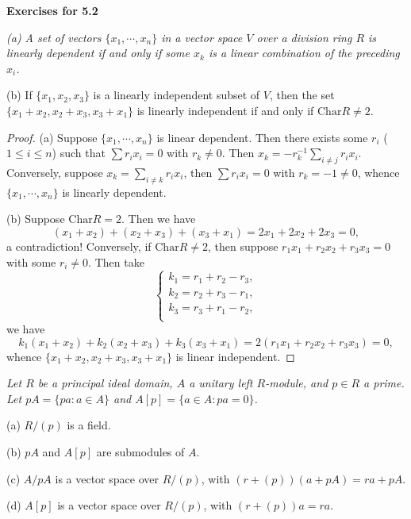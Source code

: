 \begin{center}
\begin{large}
    \textbf{Exercises for 5.2}
\end{large}
\end{center}
\begin{problem}\em
(a) A set of vectors $\{x_1,\cdots,x_n\}$ in a vector space $V$ over a division ring $R$ is linearly dependent if and only if some $x_k$ is a linear combination of the preceding $x_i$.\par
(b) If $\{x_1,x_2,x_3\}$ is a linearly independent subset of $V$, then the set $\{x_1+x_2,x_2+x_3,x_3+x_1\}$ is linearly independent if and only if $\mathrm{Char}R\ne2$.
\end{problem}
\begin{proof}
(a) Suppose $\{x_1,\cdots,x_n\}$ is linear dependent. Then there exists some $r_i$ ($1\le i\le n$) such that $\sum r_ix_i=0$ with $r_k\ne 0$. Then $x_k=-r_k^{-1}\sum_{i\ne j}r_ix_i$. Conversely, suppose $x_k=\sum_{i\ne k}r_ix_i$, then $\sum r_ix_i=0$ with $r_k=-1\ne 0$, whence $\{x_1,\cdots,x_n\}$ is linearly dependent.\par
(b) Suppose $\mathrm{Char}R=2$. Then we have 
$$
\left( x_1+x_2 \right) +\left( x_2+x_3 \right) +\left( x_3+x_1 \right) =2x_1+2x_2+2x_3=0,
$$
a contradiction! Conversely, if $\mathrm{Char}R\ne 2$, then suppose $r_1x_1+r_2x_2+r_3x_3=0$ with some $r_i\ne 0$. Then take 
$$
\begin{cases}
	k_1=r_1+r_2-r_3,\\
	k_2=r_2+r_3-r_1,\\
	k_3=r_3+r_1-r_2,\\
\end{cases}
$$
we have 
$$
k_1\left( x_1+x_2 \right) +k_2\left( x_2+x_3 \right) +k_3\left( x_3+x_1 \right) =2\left( r_1x_1+r_2x_2+r_3x_3 \right) =0,
$$
whence $\{x_1+x_2,x_2+x_3,x_3+x_1\}$ is linear independent.
\end{proof}
\begin{problem}\em
Let $R$ be a principal ideal domain, $A$ a unitary left $R$-module, and $p\in R$ a prime. Let $pA=\{pa:a\in A\}$ and $A[p]=\{a\in A:pa=0\}$.\par
(a) $R/(p)$ is a field.\par
(b) $pA$ and $A[p]$ are submodules of $A$.\par
(c) $A/pA$ is a vector space over $R/(p)$, with $(r+(p))(a+pA)=ra+pA$.\par
(d) $A[p]$ is a vector space over $R/(p)$, with $(r+(p))a=ra$.
\end{problem}
